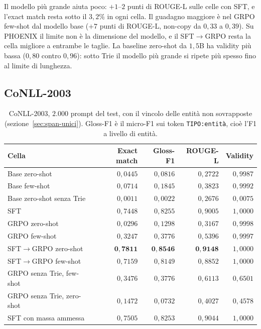 Il modello più grande aiuta poco: $+1$--$2$ punti di ROUGE-L sulle celle con
SFT, e l'exact match resta sotto il $3{,}2\%$ in ogni cella. Il guadagno
maggiore è nel GRPO few-shot dal modello base ($+7$ punti di ROUGE-L, non-copy
da $0{,}33$ a $0{,}39$). Su PHOENIX il limite non è la dimensione del modello,
e il SFT$\to$GRPO resta la cella migliore a entrambe le taglie. La baseline
zero-shot da $1{,}5$B ha validity più bassa ($0{,}80$ contro $0{,}96$): sotto
Trie il modello più grande si ripete più spesso fino al limite di lunghezza.

\subsection{CoNLL-2003}

\begin{table}[h]
\centering
\small
\begin{tabular}{lrrrr}
\toprule
Cella & Exact match & Gloss-F1 & ROUGE-L & Validity \\
\midrule
Base zero-shot                 & $0{,}0445$ & $0{,}0816$ & $0{,}2722$ & $0{,}9987$ \\
Base few-shot                  & $0{,}0714$ & $0{,}1845$ & $0{,}3823$ & $0{,}9992$ \\
Base zero-shot senza Trie      & $0{,}0011$ & $0{,}0022$ & $0{,}2676$ & $0{,}0075$ \\
SFT                            & $0{,}7448$ & $0{,}8255$ & $0{,}9005$ & $1{,}0000$ \\
GRPO zero-shot                 & $0{,}0296$ & $0{,}1298$ & $0{,}3167$ & $0{,}9998$ \\
GRPO few-shot                  & $0{,}3247$ & $0{,}3776$ & $0{,}5396$ & $0{,}9997$ \\
SFT$\to$GRPO zero-shot         & $\mathbf{0{,}7811}$ & $\mathbf{0{,}8546}$ & $\mathbf{0{,}9148}$ & $1{,}0000$ \\
SFT$\to$GRPO few-shot          & $0{,}7159$ & $0{,}8149$ & $0{,}8852$ & $1{,}0000$ \\
GRPO senza Trie, few-shot      & $0{,}3476$ & $0{,}3776$ & $0{,}6113$ & $0{,}6501$ \\
GRPO senza Trie, zero-shot     & $0{,}1472$ & $0{,}0732$ & $0{,}4027$ & $0{,}4578$ \\
SFT con massa ammessa          & $0{,}7505$ & $0{,}8253$ & $0{,}9044$ & $1{,}0000$ \\
\bottomrule
\end{tabular}
\caption{CoNLL-2003, $2.000$ prompt del test, con il vincolo delle entità non
sovrapposte (sezione~\ref{sec:span-unici}). Gloss-F1 è il micro-F1 sui token
\texttt{TIPO:entità}, cioè l'F1 a livello di entità.}
\label{tab:risultati-conll}
\end{table}

